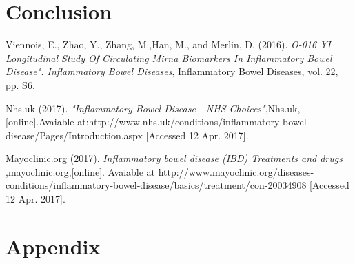 \documentclass[11pt]{article}\usepackage[]{graphicx}\usepackage[]{color}
\begin{document}
\section*{Conclusion}

\begin{thebibliography}{100}


 Viennois, E., Zhao, Y., Zhang, M.,Han, M., and Merlin, D. (2016). \textit{O-016 YI Longitudinal Study Of Circulating Mirna Biomarkers In Inflammatory Bowel Disease". Inflammatory Bowel Diseases}, Inflammatory Bowel Diseases, vol. 22, pp. S6.

 Nhs.uk (2017). \textit{"Inflammatory Bowel Disease - NHS Choices"},Nhs.uk,[online].Avaiable at:http://www.nhs.uk/conditions/inflammatory-bowel-disease/Pages/Introduction.aspx [Accessed 12 Apr. 2017].

 Mayoclinic.org (2017). \textit{Inflammatory bowel disease (IBD) Treatments and drugs} ,mayoclinic.org,[online]. Avaiable at http://www.mayoclinic.org/diseases-conditions/inflammatory-bowel-disease/basics/treatment/con-20034908 [Accessed 12 Apr. 2017].




\end{thebibliography}

\section*{Appendix}
\end{document}
